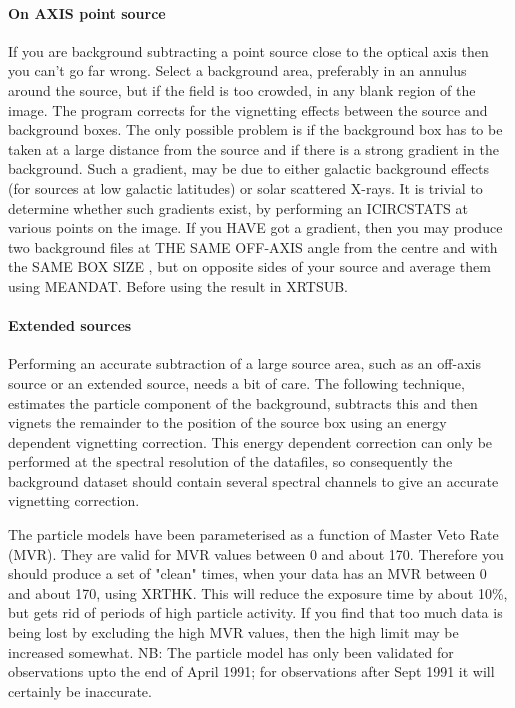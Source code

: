 \documentclass{book}
\renewcommand{\_}{{\tt\char'137}}     %
\begin{document}
\paragraph{On AXIS point source}
If you are background subtracting a point source close to the optical
axis then you can't go far wrong. Select a background area,
preferably in an annulus around the source, but if the field is too
crowded, in any blank region of the image. The program corrects for
the vignetting effects between the source and background boxes. The
only possible problem is if the background box has to be taken at a
large distance from the source and if there is a strong gradient in
the background. Such a gradient, may be due to either galactic
background effects (for sources at low galactic latitudes) or solar
scattered X-rays. It is trivial to determine whether
such gradients exist, by performing an ICIRCSTATS at various points
on the image. If you HAVE got a gradient, then you may produce two
background files at THE SAME OFF-AXIS angle from the centre and with
the SAME BOX SIZE , but on opposite sides of your source and average
them using MEANDAT. Before using the result in XRTSUB.

\paragraph{Extended sources}
Performing an accurate subtraction of a large source area, such as an
off-axis source or an extended source, needs a bit of care.
The following technique, estimates the particle component of the
background, subtracts this and then vignets the remainder to the
position of the source box using an energy dependent vignetting
correction. This energy dependent correction can only be performed
at the spectral resolution of the datafiles, so consequently the
background dataset should contain several spectral channels to give
an accurate vignetting correction.

The particle models have been parameterised as a function of Master
Veto Rate (MVR). They are valid for MVR values between 0 and about
170. Therefore you should produce a set of "clean" times, when your
data has an MVR between 0 and about 170, using XRTHK. This will reduce
the exposure time by about 10\%, but gets rid of periods of high
particle activity. If you find that too much data is being lost by
excluding the high MVR values, then the high limit may be increased
somewhat. NB: The particle model has only been validated for
observations upto the end of April 1991; for observations after
Sept 1991 it will certainly be inaccurate.
\end{document}

